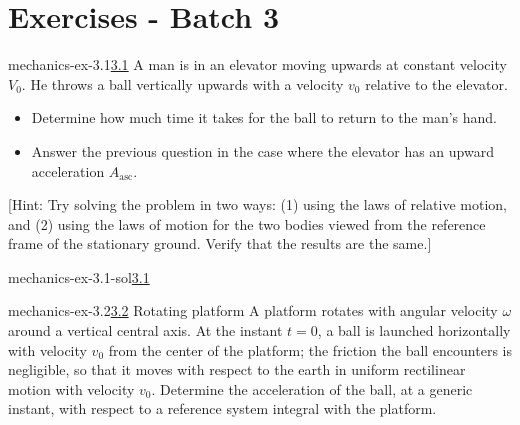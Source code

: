 \documentclass[preview]{standalone}
\begin{document}
\genpage

\section{Exercises - Batch 3}

\begin{snippetexercise}{mechanics-ex-3.1}{\underline{3.1}}
    A man is in an elevator moving upwards at constant velocity $V_0$. He throws a ball vertically upwards with a velocity $v_0$ relative to the elevator.
    \begin{itemize}
        \item Determine how much time it takes for the ball to return to the man's hand.
        \item Answer the previous question in the case where the elevator has an upward acceleration $A_{\text{asc}}$.
    \end{itemize}
    [Hint: Try solving the problem in two ways: (1) using the laws of relative motion, and (2) using the laws of motion for the two bodies viewed from the reference frame of the stationary ground. Verify that the results are the same.]
\end{snippetexercise}

\begin{snippetsolution}{mechanics-ex-3.1-sol}{\underline{3.1}}
    \todo
\end{snippetsolution}

\begin{snippetexercise}{mechanics-ex-3.2}{\underline{3.2} Rotating platform}
    A platform rotates with angular velocity
    \(\omega\) around a vertical central axis.
    At the instant \(t=0\), a ball is launched horizontally with velocity \(v_0\)
    from the center of the platform; the friction the ball encounters is negligible,
    so that it moves with respect to the earth in uniform rectilinear motion with velocity \(v_0\).
    Determine the acceleration of the ball, at a generic instant, with respect to a reference system
    integral with the platform.
\end{snippetexercise}
\end{document}

